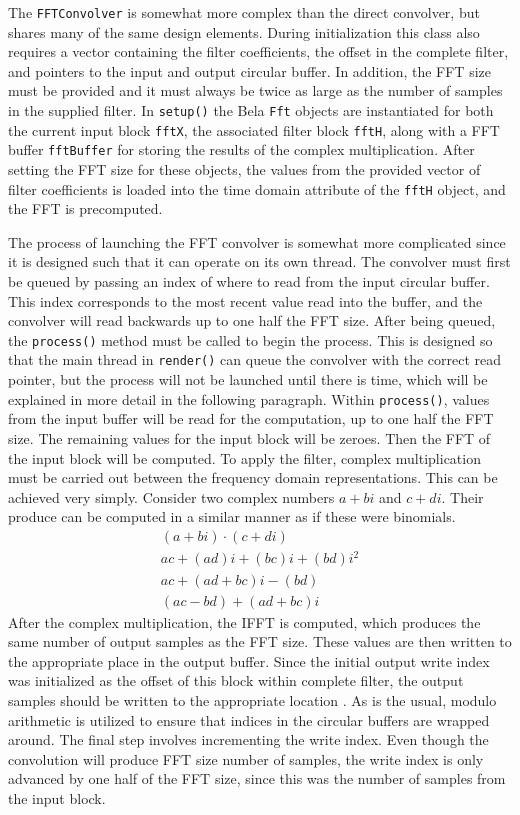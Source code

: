 \documentclass{article}
\begin{document}
The \texttt{FFTConvolver} is somewhat more complex than the direct convolver, but shares many of the same design elements. 
During initialization this class also requires a vector containing the filter coefficients, the offset in the complete filter, 
and pointers to the input and output circular buffer. 
In addition, the FFT size must be provided and it must always be twice as large as the number of samples in the supplied filter. 
In \texttt{setup()} the Bela \texttt{Fft} objects are instantiated for both the current input block \texttt{fftX}, 
the associated filter block \texttt{fftH}, along with a FFT buffer \texttt{fftBuffer} for storing the results of the complex multiplication.
After setting the FFT size for these objects, the values from the provided vector of filter coefficients is loaded into the 
time domain attribute of the \texttt{fftH} object, and the FFT is precomputed.

The process of launching the FFT convolver is somewhat more complicated since it is designed such that it can operate on its own thread. 
The convolver must first be queued by passing an index of where to read from the input circular buffer. 
This index corresponds to the most recent value read into the buffer, and the convolver will read backwards 
up to one half the FFT size. 
After being queued, the \texttt{process()} method must be called to begin the process. 
This is designed so that the main thread in \texttt{render()} can queue the convolver with the correct read pointer, 
but the process will not be launched until there is time, which will be explained in more detail in the following paragraph. 
Within \texttt{process()}, values from the input buffer will be read for the computation, up to one half the FFT size. 
The remaining values for the input block will be zeroes. Then the FFT of the input block will be computed. 
To apply the filter, complex multiplication must be carried out between the frequency domain representations. 
This can be achieved very simply. 
Consider two complex numbers $a + bi$ and $c + di$. 
Their produce can be computed in a similar manner as if these were binomials. 
\begin{align*}
    (a + bi) \cdot (c + di) \\
    ac + (ad)i + (bc)i + (bd)i^2 \\
    ac + (ad + bc)i - (bd) \\
    (ac - bd) + (ad + bc)i
\end{align*}
After the complex multiplication, the IFFT is computed, 
which produces the same number of output samples as the FFT size. 
These values are then written to the appropriate place in the output buffer. 
Since the initial output write index was initialized as the offset of this block within complete filter, 
the output samples should be written to the appropriate location .
As is the usual, modulo arithmetic is utilized to ensure that indices in the circular buffers are wrapped around. 
The final step involves incrementing the write index. 
Even though the convolution will produce FFT size number of samples, 
the write index is only advanced by one half of the FFT size, since this was the number of samples from the input block. 
\end{document}

